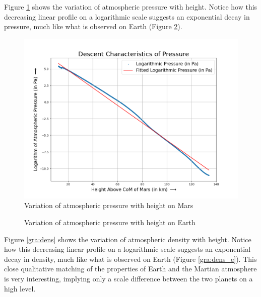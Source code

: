 \no Figure \ref{gra:pres} shows the variation of atmospheric pressure with height. Notice how this decreasing linear profile on a logarithmic scale suggests an exponential decay in pressure, much like what is observed on Earth (Figure \ref{gra:pres_e}).

\begin{figure}[H]
  \includegraphics[scale=0.4]{Pictures/Chapter_7_Future/Log_Pressure_Plot.png}
  \centering
  \caption{Variation of atmospheric pressure with height on Mars}
  \label{gra:pres}
\end{figure}

\begin{figure}[H]
	\centering
    
    \caption{Variation of atmospheric pressure with height on Earth}
	\label{gra:pres_e}
\end{figure}

\no Figure \ref{gra:dens} shows the variation of atmospheric density with height. Notice how this decreasing linear profile on a logarithmic scale suggests an exponential decay in density, much like what is observed on Earth (Figure \ref{gra:dens_e}). This close qualitative matching of the properties of Earth and the Martian atmosphere is very interesting, implying only a scale difference between the two planets on a high level.

